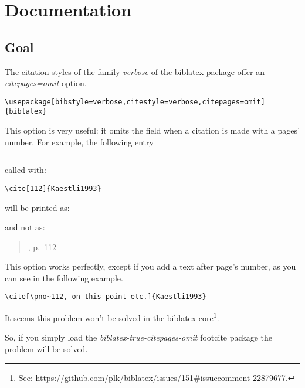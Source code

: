 \documentclass{ltxdockit}[2011/03/25]
\newcommand{\biblatex}{biblatex\xspace}
\begin{document}
\printtitlepage
\tableofcontents

\section{Documentation}

\subsection{Goal}
The citation styles of the family \emph{verbose} of the \biblatex package offer an \emph{citepages=omit} option.
\begin{verbatim}
\usepackage[bibstyle=verbose,citestyle=verbose,citepages=omit]{biblatex}
\end{verbatim}

This option is very useful: it omits the  field when a citation is made with a pages' number. For example, the following entry

\inputminted{tex}{biblatex-true-citepages-omit.bib}

called with:

\begin{verbatim}
\cite[112]{Kaestli1993}
\end{verbatim} 

will be printed as:

\begin{quotation}
\cite[112]{Kaestli1993}
\end{quotation}

and not as:
\citereset

\begin{quotation}
\cite{Kaestli1993}, p.~112
\end{quotation}

This option works perfectly, except if you add a text after page's number, as you can see in the following example.

\begin{verbatim}
\cite[\pno~112, on this point etc.]{Kaestli1993}
\end{verbatim}

\citereset
\begin{quotation}
\cite[\pno~112, on this point etc.]{Kaestli1993}
\end{quotation}

It seems this problem won't be solved in the \biblatex core\footnote{See: \url{https://github.com/plk/biblatex/issues/151\#issuecomment-22879677}.}.

So, if you simply load the \emph{biblatex-true-citepages-omit} footcite package the problem will be solved.
\end{document}
